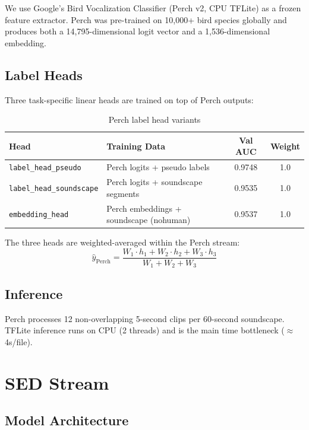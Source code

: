 \documentclass[11pt,a4paper]{article}
\begin{document}
We use Google's Bird Vocalization Classifier (Perch v2, CPU TFLite) as a frozen
feature extractor. Perch was pre-trained on 10{,}000+ bird species globally and
produces both a 14{,}795-dimensional logit vector and a 1{,}536-dimensional embedding.

\subsection{Label Heads}

Three task-specific linear heads are trained on top of Perch outputs:

\begin{table}[H]
\centering
\caption{Perch label head variants}
\begin{tabular}{llcc}
\toprule
\textbf{Head} & \textbf{Training Data} & \textbf{Val AUC} & \textbf{Weight} \\
\midrule
\texttt{label\_head\_pseudo} & Perch logits + pseudo labels & 0.9748 & 1.0 \\
\texttt{label\_head\_soundscape} & Perch logits + soundscape segments & 0.9535 & 1.0 \\
\texttt{embedding\_head} & Perch embeddings + soundscape (nohuman) & 0.9537 & 1.0 \\
\bottomrule
\end{tabular}
\end{table}

\noindent The three heads are weighted-averaged within the Perch stream:
\[
\hat{y}_{\text{Perch}} = \frac{W_1 \cdot h_1 + W_2 \cdot h_2 + W_3 \cdot h_3}{W_1 + W_2 + W_3}
\]

\subsection{Inference}

Perch processes 12 non-overlapping 5-second clips per 60-second soundscape. TFLite
inference runs on CPU (2 threads) and is the main time bottleneck ($\approx$4s/file).

\section{SED Stream}
\label{sec:sed}

\subsection{Model Architecture}
\end{document}
